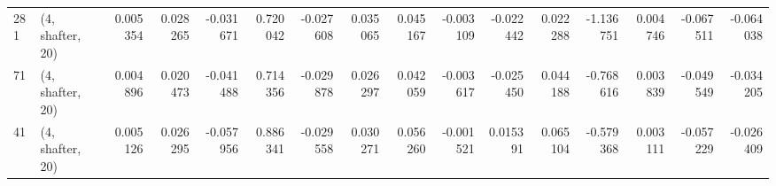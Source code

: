 \begin{tabular}{llrrrrrrrrrrrrrr}
281 &  (4, shafter, 20) &   0.005354 &  0.028265 & -0.031671 &    0.720042 & -0.027608 &   0.035065 &  0.045167 & -0.003109 & -0.022442 &  0.022288 &   -1.136751 &  0.004746 & -0.067511 & -0.064038 \\
71  &  (4, shafter, 20) &   0.004896 &  0.020473 & -0.041488 &    0.714356 & -0.029878 &   0.026297 &  0.042059 & -0.003617 & -0.025450 &  0.044188 &   -0.768616 &  0.003839 & -0.049549 & -0.034205 \\
41  &  (4, shafter, 20) &   0.005126 &  0.026295 & -0.057956 &    0.886341 & -0.029558 &   0.030271 &  0.056260 & -0.001521 &  0.015391 &  0.065104 &   -0.579368 &  0.003111 & -0.057229 & -0.026409 \\
\bottomrule
\end{tabular}
